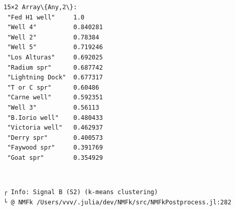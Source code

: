 \documentclass[11pt]{article}
\begin{document}
    \begin{Verbatim}[commandchars=\\\{\}]
15×2 Array\{Any,2\}:
 "Fed H1 well"     1.0
 "Well 4"          0.840281
 "Well 2"          0.78384
 "Well 5"          0.719246
 "Los Alturas"     0.692025
 "Radium spr"      0.687742
 "Lightning Dock"  0.677317
 "T or C spr"      0.60486
 "Carne well"      0.592351
 "Well 3"          0.56113
 "B.Iorio well"    0.480433
 "Victoria well"   0.462937
 "Derry spr"       0.400573
 "Faywood spr"     0.391769
 "Goat spr"        0.354929
    \end{Verbatim}


    \begin{center}
    \end{center}
    { \hspace*{\fill} \\}

    \begin{Verbatim}[commandchars=\\\{\}]
┌ Info: Signal B (S2) (k-means clustering)
└ @ NMFk /Users/vvv/.julia/dev/NMFk/src/NMFkPostprocess.jl:282
    \end{Verbatim}

    \begin{center}
    \end{center}
    { \hspace*{\fill} \\}

    \begin{Verbatim}[commandchars=\\\{\}]

    \end{Verbatim}

    \begin{center}
    \end{center}
    { \hspace*{\fill} \\}

    \begin{center}
    \end{center}
    { \hspace*{\fill} \\}
\end{document}
